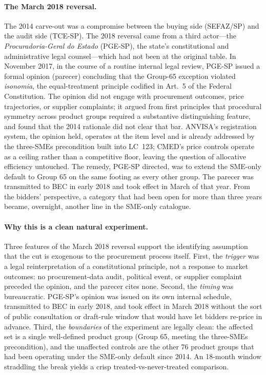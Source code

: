 \documentclass[12pt]{article}
\begin{document}
\paragraph{The March 2018 reversal.}
The 2014 carve-out was a compromise between the buying side
(SEFAZ/SP) and the audit side (TCE-SP). The 2018 reversal came
from a third actor---the \emph{Procuradoria-Geral do Estado}
(PGE-SP), the state's constitutional and administrative legal
counsel---which had not been at the original table. In November
2017, in the course of a routine internal legal review, PGE-SP
issued a formal opinion (parecer) concluding that the Group-65
exception violated \emph{isonomia}, the equal-treatment
principle codified in Art.~5 of the Federal Constitution. The
opinion did not engage with procurement outcomes, price
trajectories, or supplier complaints; it argued from first
principles that procedural symmetry across product groups
required a substantive distinguishing feature, and found that
the 2014 rationale did not clear that bar. ANVISA's registration
system, the opinion held, operates at the item level and is
already addressed by the three-SMEs precondition built into
LC~123; CMED's price controls operate as a ceiling rather than a
competitive floor, leaving the question of allocative efficiency
untouched. The remedy, PGE-SP directed, was to extend the
SME-only default to Group 65 on the same footing as every other
group. The parecer was transmitted to BEC in early 2018 and took
effect in March of that year. From the bidders' perspective, a
category that had been open for more than three years became,
overnight, another line in the SME-only catalogue.

\paragraph{Why this is a clean natural experiment.}
Three features of the March 2018 reversal support the identifying
assumption that the cut is exogenous to the procurement process
itself. First, the \emph{trigger} was a legal reinterpretation of
a constitutional principle, not a response to market outcomes:
no procurement-data audit, political event, or supplier complaint
preceded the opinion, and the parecer cites none. Second, the
\emph{timing} was bureaucratic. PGE-SP's opinion was issued on
its own internal schedule, transmitted to BEC in early 2018, and
took effect in March 2018 without the sort of public consultation
or draft-rule window that would have let bidders re-price in
advance. Third, the \emph{boundaries} of the experiment are
legally clean: the affected set is a single well-defined product
group (Group 65, meeting the three-SMEs precondition), and the
unaffected controls are the other 76 product groups that had
been operating under the SME-only default since 2014. An
18-month window straddling the break yields a crisp
treated-vs-never-treated comparison.
\end{document}
